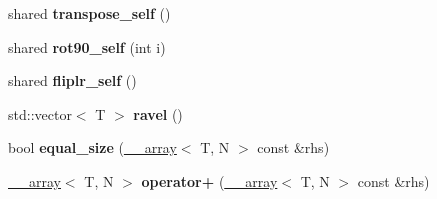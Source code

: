 \begin{DoxyCompactItemize}
\item 
\hypertarget{class____array_ac1c5c3051c03e39b9715903ee0fb202d}{shared {\bfseries transpose\-\_\-self} ()}\label{class____array_ac1c5c3051c03e39b9715903ee0fb202d}

\item 
\hypertarget{class____array_a0f127aa40d72c1087c538619e5cd6ef9}{shared {\bfseries rot90\-\_\-self} (int i)}\label{class____array_a0f127aa40d72c1087c538619e5cd6ef9}

\item 
\hypertarget{class____array_a9de6105d23a33b20a4b0cc02b923edb4}{shared {\bfseries fliplr\-\_\-self} ()}\label{class____array_a9de6105d23a33b20a4b0cc02b923edb4}

\item 
\hypertarget{class____array_a07f72930f0260b81df31b991f4c7e97d}{std\-::vector$<$ T $>$ {\bfseries ravel} ()}\label{class____array_a07f72930f0260b81df31b991f4c7e97d}

\item 
\hypertarget{class____array_accc02e65ce775d472554778825ebdeda}{bool {\bfseries equal\-\_\-size} (\hyperlink{class____array}{\-\_\-\-\_\-array}$<$ T, N $>$ const \&rhs)}\label{class____array_accc02e65ce775d472554778825ebdeda}

\item 
\hypertarget{class____array_a435566ff4cab00684e41335595b4c60c}{\hyperlink{class____array}{\-\_\-\-\_\-array}$<$ T, N $>$ {\bfseries operator+} (\hyperlink{class____array}{\-\_\-\-\_\-array}$<$ T, N $>$ const \&rhs)}\label{class____array_a435566ff4cab00684e41335595b4c60c}

\end{DoxyCompactItemize}
